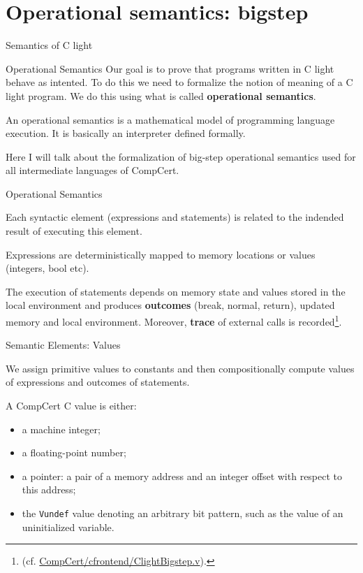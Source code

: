 \documentclass{beamer}
\begin{document}
  \section{Operational semantics: bigstep}
  \begin{frame}
  \begin{center}
    \huge Semantics of C light
    \end{center}
  \end{frame}

  \begin{frame}{Operational Semantics}
    Our goal is to prove that programs written in C light behave as intented. To do this we need to formalize the notion of meaning of a C light program. We do this using what is called {\bf operational semantics}.

    \bigskip
    
    An operational semantics is a mathematical model of programming language execution. It is basically an interpreter defined formally.
    \bigskip
    
    Here I will talk about the formalization of big-step operational semantics used for all intermediate languages of CompCert.
  \end{frame}
  \begin{frame}{Operational Semantics}
 
    Each syntactic element (expressions and statements) is related to the indended result of executing this element.

    \bigskip
    
    Expressions are deterministically mapped to memory locations or values (integers, bool etc).

    \bigskip 
    The execution of statements depends on memory state and values stored in the local environment and produces {\bf outcomes} (break, normal, return), updated memory and local environment. Moreover, {\bf trace} of external calls is recorded\footnote{       (cf. \url{CompCert/cfrontend/ClightBigstep.v}).}.
     
    \end{frame}

    \begin{frame}{Semantic Elements: Values}
      
      We assign primitive values to constants and then compositionally compute values of expressions and outcomes of statements.

      \bigskip
      
      A CompCert C value is either:
      
    \begin{itemize}
    
\item a machine integer;
\item a floating-point number;
\item a pointer: a pair of a memory address and an integer offset with respect
  to this address;
\item the \texttt{Vundef} value denoting an arbitrary bit pattern, such as the
  value of an uninitialized variable.
 \end{itemize}
\end{frame}
\end{document}
